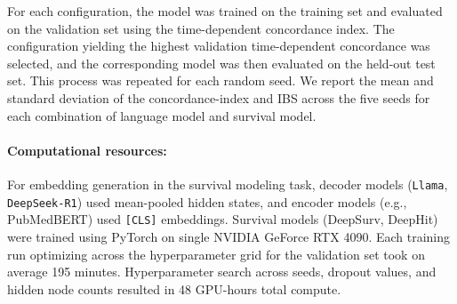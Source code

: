 \documentclass[pdflatex,sn-mathphys-num]{sn-jnl}%
\theoremstyle{thmstyleone}%
\theoremstyle{thmstyletwo}%
\theoremstyle{thmstylethree}%
\begin{document}
For each configuration, the model was trained on the training set and evaluated on the validation set using the time-dependent concordance index. 
The configuration yielding the highest validation time-dependent concordance was selected, and the corresponding model was then evaluated on the held-out test set. 
This process was repeated for each random seed.
We report the mean and standard deviation of the concordance-index and IBS across the five seeds for each combination of language model and survival model. 

\paragraph{Computational resources:}
For embedding generation in the survival modeling task, decoder models (\texttt{Llama}, \texttt{DeepSeek-R1}) used mean-pooled hidden states, and encoder models (e.g., PubMedBERT) used \texttt{[CLS]} embeddings. Survival models (DeepSurv, DeepHit) were trained using PyTorch on single NVIDIA GeForce RTX 4090. Each training run optimizing across the hyperparameter grid for the validation set took on average 195 minutes. Hyperparameter search across seeds, dropout values, and hidden node counts resulted in 48 GPU-hours total compute.





\end{document}
